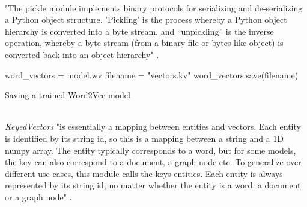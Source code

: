 \documentclass[a4paper, 11pt,titlepage,oneside,openany]{book}
\begin{document}
\\ "The pickle module implements binary protocols for serializing and de-serializing a Python object structure. 'Pickling' is the process whereby a Python object hierarchy is converted into a byte stream, and “unpickling” is the inverse operation, whereby a byte stream (from a binary file or bytes-like object) is converted back into an object hierarchy" \cite{pickle}.
\begin{algorithm}[h]
	\DontPrintSemicolon
	word\_vectors = model.wv\;
	filename = "vectors.kv"\;
	word\_vectors.save(filename)\;
	\caption{Saving a trained Word2Vec model}
\end{algorithm}
\\ \textit{KeyedVectors} "is essentially a mapping between entities and vectors. Each entity is identified by its string id, so this is a mapping between a string and a 1D numpy array. The entity typically corresponds to a word, but for some models, the key can also correspond to a document, a graph node etc. To generalize over different use-cases, this module calls the keys entities. Each entity is always represented by its string id, no matter whether the entity is a word, a document or a graph node" \cite{keyedvectors}.
\end{document}
